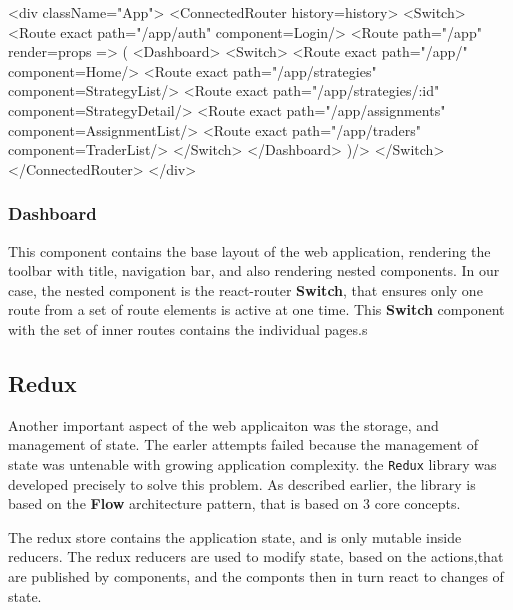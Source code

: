 \begin{code}[language=html,label={react_routing},caption={React application routing JSX}]
<div className="App">
    <ConnectedRouter history={history}>
        <Switch>
            <Route exact path="/app/auth" component={Login}/>
            <Route path="/app" render={props => (
            <Dashboard>
                <Switch>
                    <Route exact path="/app/" component={Home}/>
                    <Route exact path="/app/strategies" component={StrategyList}/>
                    <Route exact path="/app/strategies/:id" component={StrategyDetail}/>
                    <Route exact path="/app/assignments" component={AssignmentList}/>
                    <Route exact path="/app/traders" component={TraderList}/>
                </Switch>
            </Dashboard>
        )}/>
        </Switch>
    </ConnectedRouter>
</div>
\end{code}

\subsubsection{Dashboard}
This component contains the base layout of the web application, rendering the toolbar with title, navigation bar,
and also rendering nested components. In our case, the nested component is the react-router \textbf{Switch},
that ensures only one route from a set of route elements is active at one time. This \textbf{Switch} component
with the set of inner routes contains the individual pages.s

\subsection{Redux}
Another important aspect of the web applicaiton was the storage, and management of state. The earler attempts failed
because the management of state was untenable with growing application complexity.
the \verb|Redux| library was developed precisely to solve this problem.
As described earlier, the library is based on the \textbf{Flow} architecture pattern, that is based on 3 core concepts.

The redux store contains the application state, and is only mutable inside reducers. The redux reducers are used
to modify state, based on the actions,that are published by components, and the componts then in turn react to
changes of state.


